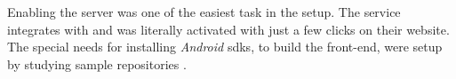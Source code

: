 Enabling the  server was one of the easiest task in the setup.
The  service integrates with  and was literally activated with just a few clicks on their website.
The special needs for installing \textit{Android} \glspl{sdk}, to build the front-end, were setup by studying  sample repositories \citep{testing:nativescript:sample}.
